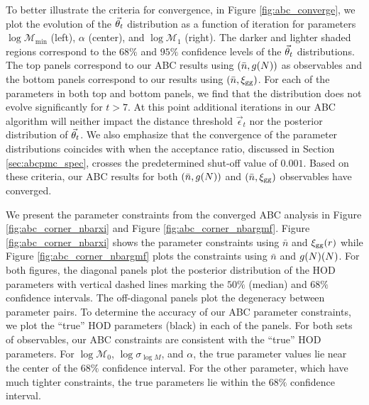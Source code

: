 To better illustrate the criteria for convergence, in Figure \ref{fig:abc_converge}, 
we plot the evolution of the $\vec{\theta}_t$ distribution as a function of iteration 
for parameters $\log\mathcal{M}_\mathrm{min}$ (left), $\alpha$ (center), and 
$\log\mathcal{M}_1$ (right). The darker and lighter shaded regions correspond to the 
$68\%$ and $95\%$ confidence levels of the $\vec{\theta}_t$ distributions. The top panels 
correspond to our ABC results using $(\bar{n}, g(N))$ as observables and the bottom 
panels correspond to our results using $(\bar{n}, \xi_{\mathrm{gg}})$. 
For each of the parameters in both top and bottom panels, we find that the distribution 
does not evolve significantly for $t > 7$. At this point additional iterations in
our ABC algorithm will neither impact the distance threshold $\vec\epsilon_t$ nor 
the posterior distribution of $\vec{\theta}_t$. We also emphasize that the convergence of the 
parameter distributions coincides with when the acceptance ratio, discussed in Section 
\ref{sec:abcpmc_spec}, crosses the predetermined shut-off value of $0.001$. Based on these criteria, 
our ABC results for both $(\bar{n}, g(N))$ and $(\bar{n}, \xi_{\mathrm{gg}})$ observables have converged. 

We present the parameter constraints from the converged ABC analysis in Figure \ref{fig:abc_corner_nbarxi} and 
Figure \ref{fig:abc_corner_nbargmf}. Figure \ref{fig:abc_corner_nbarxi} shows 
the parameter constraints using $\bar{n}$ and $\xi_{\mathrm{gg}}(r)$ while Figure 
\ref{fig:abc_corner_nbargmf} plots the constraints using $\bar{n}$ and $g(N)(N)$.
For both figures, the diagonal panels plot the posterior distribution of the 
HOD parameters with vertical dashed lines marking the $50\%$ (median) and $68\%$ 
confidence intervals. The off-diagonal panels plot the degeneracy between  
parameter pairs. To determine the accuracy of our ABC parameter constraints, we plot
the ``true'' HOD parameters (black) in each of the panels.
For both sets of observables, our ABC constraints are consistent with the 
``true'' HOD parameters. For $\log\mathcal{M}_0$, $\log\sigma_{\log M}$,
and $\alpha$, the true parameter values lie near the center of the $68\%$ confidence 
interval. For the other parameter, which have much tighter constraints, the true 
parameters lie within the $68\%$ confidence interval.  

